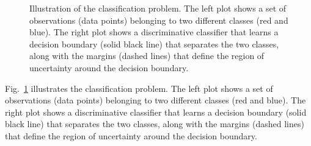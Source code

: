 \begin{figure}[htbp]
{
} %
\caption{Illustration of the classification problem. The left plot shows a set of observations (data points) belonging to two different classes (red and blue). The right plot shows a discriminative classifier that learns a decision boundary (solid black line) that separates the two classes, along with the margins (dashed lines) that define the region of uncertainty around the decision boundary.}

\label{fig:classification_problem}
\end{figure}

Fig.~\ref{fig:classification_problem} illustrates the classification problem. The left plot shows a set of observations (data points) belonging to two different classes (red and blue). The right plot shows a discriminative classifier that learns a decision boundary (solid black line) that separates the two classes, along with the margins (dashed lines) that define the region of uncertainty around the decision boundary. 

